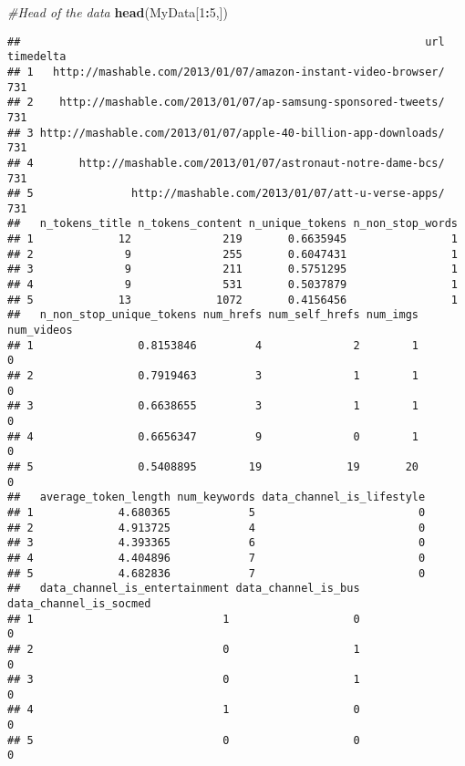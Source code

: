 \documentclass[]{article}
\newenvironment{Shaded}{\begin{snugshade}}{\end{snugshade}}
\newcommand{\KeywordTok}[1]{\textcolor[rgb]{0.13,0.29,0.53}{\textbf{#1}}}
\newcommand{\DecValTok}[1]{\textcolor[rgb]{0.00,0.00,0.81}{#1}}
\newcommand{\CommentTok}[1]{\textcolor[rgb]{0.56,0.35,0.01}{\textit{#1}}}
\newcommand{\OperatorTok}[1]{\textcolor[rgb]{0.81,0.36,0.00}{\textbf{#1}}}
\newcommand{\NormalTok}[1]{#1}
\begin{document}
\begin{Shaded}
\begin{Highlighting}[]
\CommentTok{#Head of the data}
\KeywordTok{head}\NormalTok{(MyData[}\DecValTok{1}\OperatorTok{:}\DecValTok{5}\NormalTok{,])}
\end{Highlighting}
\end{Shaded}

\begin{verbatim}
##                                                              url timedelta
## 1   http://mashable.com/2013/01/07/amazon-instant-video-browser/       731
## 2    http://mashable.com/2013/01/07/ap-samsung-sponsored-tweets/       731
## 3 http://mashable.com/2013/01/07/apple-40-billion-app-downloads/       731
## 4       http://mashable.com/2013/01/07/astronaut-notre-dame-bcs/       731
## 5               http://mashable.com/2013/01/07/att-u-verse-apps/       731
##   n_tokens_title n_tokens_content n_unique_tokens n_non_stop_words
## 1             12              219       0.6635945                1
## 2              9              255       0.6047431                1
## 3              9              211       0.5751295                1
## 4              9              531       0.5037879                1
## 5             13             1072       0.4156456                1
##   n_non_stop_unique_tokens num_hrefs num_self_hrefs num_imgs num_videos
## 1                0.8153846         4              2        1          0
## 2                0.7919463         3              1        1          0
## 3                0.6638655         3              1        1          0
## 4                0.6656347         9              0        1          0
## 5                0.5408895        19             19       20          0
##   average_token_length num_keywords data_channel_is_lifestyle
## 1             4.680365            5                         0
## 2             4.913725            4                         0
## 3             4.393365            6                         0
## 4             4.404896            7                         0
## 5             4.682836            7                         0
##   data_channel_is_entertainment data_channel_is_bus data_channel_is_socmed
## 1                             1                   0                      0
## 2                             0                   1                      0
## 3                             0                   1                      0
## 4                             1                   0                      0
## 5                             0                   0                      0

\end{verbatim}
\end{document}
